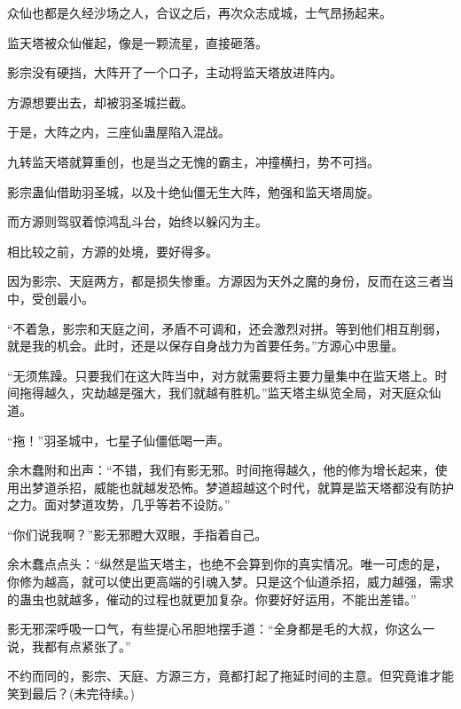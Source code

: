 \begin{this_body}
众仙也都是久经沙场之人，合议之后，再次众志成城，士气昂扬起来。

监天塔被众仙催起，像是一颗流星，直接砸落。

影宗没有硬挡，大阵开了一个口子，主动将监天塔放进阵内。

方源想要出去，却被羽圣城拦截。

于是，大阵之内，三座仙蛊屋陷入混战。

九转监天塔就算重创，也是当之无愧的霸主，冲撞横扫，势不可挡。

影宗蛊仙借助羽圣城，以及十绝仙僵无生大阵，勉强和监天塔周旋。

而方源则驾驭着惊鸿乱斗台，始终以躲闪为主。

相比较之前，方源的处境，要好得多。

因为影宗、天庭两方，都是损失惨重。方源因为天外之魔的身份，反而在这三者当中，受创最小。

“不着急，影宗和天庭之间，矛盾不可调和，还会激烈对拼。等到他们相互削弱，就是我的机会。此时，还是以保存自身战力为首要任务。”方源心中思量。

“无须焦躁。只要我们在这大阵当中，对方就需要将主要力量集中在监天塔上。时间拖得越久，灾劫越是强大，我们就越有胜机。”监天塔主纵览全局，对天庭众仙道。

“拖！”羽圣城中，七星子仙僵低喝一声。

余木蠢附和出声：“不错，我们有影无邪。时间拖得越久，他的修为增长起来，使用出梦道杀招，威能也就越发恐怖。梦道超越这个时代，就算是监天塔都没有防护之力。面对梦道攻势，几乎等若不设防。”

“你们说我啊？”影无邪瞪大双眼，手指着自己。

余木蠢点点头：“纵然是监天塔主，也绝不会算到你的真实情况。唯一可虑的是，你修为越高，就可以使出更高端的引魂入梦。只是这个仙道杀招，威力越强，需求的蛊虫也就越多，催动的过程也就更加复杂。你要好好运用，不能出差错。”

影无邪深呼吸一口气，有些提心吊胆地摆手道：“全身都是毛的大叔，你这么一说，我都有点紧张了。”

不约而同的，影宗、天庭、方源三方，竟都打起了拖延时间的主意。但究竟谁才能笑到最后？(未完待续。)

\end{this_body}

